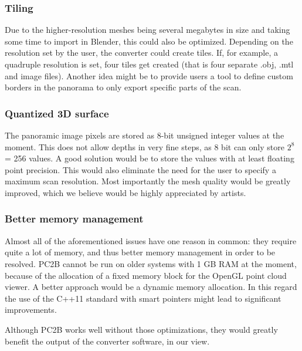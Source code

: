 \subsubsection{Tiling}

Due to the higher-resolution meshes being several megabytes in size and taking some time to import in Blender, this could also be optimized.
Depending on the resolution set by the user, the converter could create tiles. If, for example, a quadruple resolution is set, four tiles get created (that is four separate .obj, .mtl and image files). Another idea might be to provide users a tool to define custom borders in the panorama to only export specific parts of the scan.

\subsubsection{Quantized 3D surface}

The panoramic image pixels are stored as 8-bit unsigned integer values at the moment. This does not allow depths in very fine steps, as 8 bit can only store $2^{8}$ = 256 values. A good solution would be to store the values with at least floating point precision. This would also eliminate the need for the user to specify a maximum scan resolution. Most importantly the mesh quality would be greatly improved, which we believe would be highly appreciated by artists.

\subsubsection{Better memory management}

Almost all of the aforementioned issues have one reason in common: they require quite a lot of memory, and thus better memory management in order to be resolved. PC2B cannot be run on older systems with 1 GB RAM at the moment, because of the allocation of a fixed memory block for the OpenGL point cloud viewer. A better approach would be a dynamic memory allocation. In this regard the use of the C++11 standard with smart pointers might lead to significant improvements.

Although PC2B works well without those optimizations, they would greatly benefit the output of the converter software, in our view.